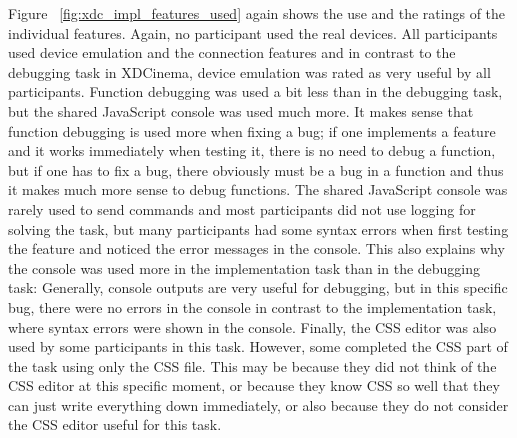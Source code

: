 Figure ~\ref{fig:xdc_impl_features_used} again shows the use and the ratings of the individual features. Again, no participant used the real devices. All participants used device emulation and the connection features and in contrast to the debugging task in XDCinema, device emulation was rated as very useful by all participants. Function debugging was used a bit less than in the debugging task, but the shared JavaScript console was used much more. It makes sense that function debugging is used more when fixing a bug; if one implements a feature and it works immediately when testing it, there is no need to debug a function, but if one has to fix a bug, there obviously must be a bug in a function and thus it makes much more sense to debug functions. The shared JavaScript console was rarely used to send commands and most participants did not use logging for solving the task, but many participants had some syntax errors when first testing the feature and noticed the error messages in the console. This also explains why the console was used more in the implementation task than in the debugging task: Generally, console outputs are very useful for debugging, but in this specific bug, there were no errors in the console in contrast to the implementation task, where syntax errors were shown in the console. Finally, the CSS editor was also used by some participants in this task. However, some completed the CSS part of the task using only the CSS file. This may be because they did not think of the CSS editor at this specific moment, or because they know CSS so well that they can just write everything down immediately, or also because they do not consider the CSS editor useful for this task.

